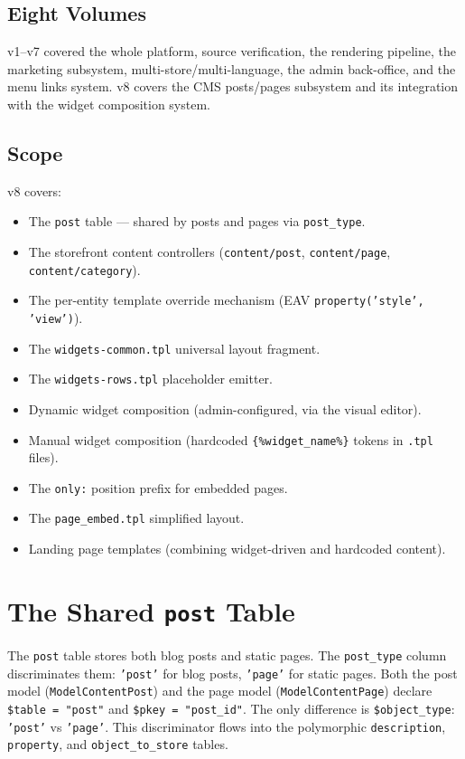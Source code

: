 \documentclass[11pt,a4paper]{article}
\begin{document}
\subsection{Eight Volumes}

v1--v7 covered the whole platform, source verification, the rendering pipeline,
the marketing subsystem, multi-store/multi-language, the admin back-office, and
the menu links system. v8 covers the CMS posts/pages subsystem and its
integration with the widget composition system.

\subsection{Scope}

v8 covers:
\begin{itemize}[leftmargin=1.6em,itemsep=2pt]
  \item The \texttt{post} table --- shared by posts and pages via
        \texttt{post\_type}.
  \item The storefront content controllers (\texttt{content/post},
        \texttt{content/page}, \texttt{content/category}).
  \item The per-entity template override mechanism (EAV
        \texttt{property('style', 'view')}).
  \item The \texttt{widgets-common.tpl} universal layout fragment.
  \item The \texttt{widgets-rows.tpl} placeholder emitter.
  \item Dynamic widget composition (admin-configured, via the visual editor).
  \item Manual widget composition (hardcoded \texttt{\{\%widget\_name\%\}}
        tokens in \texttt{.tpl} files).
  \item The \texttt{only:} position prefix for embedded pages.
  \item The \texttt{page\_embed.tpl} simplified layout.
  \item Landing page templates (combining widget-driven and hardcoded content).
\end{itemize}

\section{The Shared \texttt{post} Table}\label{sec:post-table}

\begin{findingbox}
The \texttt{post} table stores both blog posts and static pages. The
\texttt{post\_type} column discriminates them: \texttt{'post'} for blog
posts, \texttt{'page'} for static pages. Both the post model
(\texttt{ModelContentPost}) and the page model
(\texttt{ModelContentPage}) declare \texttt{\$table = "post"} and
\texttt{\$pkey = "post\_id"}. The only difference is
\texttt{\$object\_type}: \texttt{'post'} vs \texttt{'page'}. This
discriminator flows into the polymorphic \texttt{description},
\texttt{property}, and \texttt{object\_to\_store} tables.
\end{findingbox}
\end{document}
